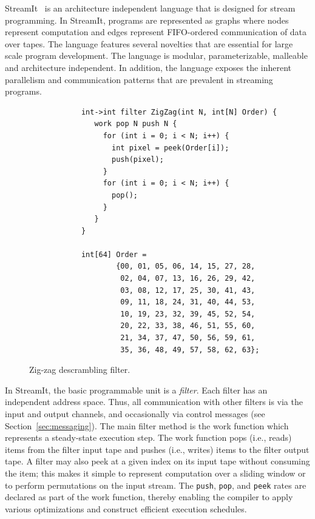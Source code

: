 \label{sec:streamit}

StreamIt~\cite{streamitcc} is an architecture independent language
that is designed for stream programming. In StreamIt, programs are
represented as graphs where nodes represent computation and edges
represent FIFO-ordered communication of data over tapes. The language
features several novelties that are essential for large scale program
development. The language is modular, parameterizable, malleable and
architecture independent. In addition, the language exposes the
inherent parallelism and communication patterns that are prevalent in
streaming programs.

\begin{figure}[t]
  \begin{scriptsize}
	\begin{verbatim}
	        int->int filter ZigZag(int N, int[N] Order) {
	           work pop N push N {
	             for (int i = 0; i < N; i++) {
	               int pixel = peek(Order[i]);
	               push(pixel);
	             }
	             for (int i = 0; i < N; i++) {
	               pop();
	             }
	           }
	        }

	        int[64] Order =
	                {00, 01, 05, 06, 14, 15, 27, 28,
	                 02, 04, 07, 13, 16, 26, 29, 42,
	                 03, 08, 12, 17, 25, 30, 41, 43,
	                 09, 11, 18, 24, 31, 40, 44, 53,
	                 10, 19, 23, 32, 39, 45, 52, 54,
	                 20, 22, 33, 38, 46, 51, 55, 60,
	                 21, 34, 37, 47, 50, 56, 59, 61,
	                 35, 36, 48, 49, 57, 58, 62, 63};
	\end{verbatim}
  \end{scriptsize}
  \vspace{-12pt}
  \caption{Zig-zag descrambling filter.}
  \label{fig:zigzag-filter}
\end{figure}

In StreamIt, the basic programmable unit is a {\it filter}.  Each
filter has an independent address space. Thus, all communication with
other filters is via the input and output channels, and occasionally
via control messages (see Section~\ref{sec:messaging}).  The main filter 
method is the work function which represents a steady-state execution step.
The work function pops (i.e., reads) items from the filter input tape
and pushes (i.e., writes) items to the filter output tape. A filter
may also peek at a given index on its input tape without consuming the
item; this makes it simple to represent computation over a sliding
window or to perform permutations on the input stream. The {\tt push},
{\tt pop}, and {\tt peek} rates are declared as part of the work
function, thereby enabling the compiler to apply various optimizations
and construct efficient execution schedules.

